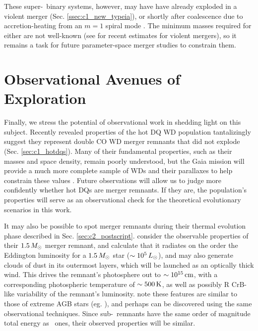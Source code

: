 These super-\Mch\ binary systems, however, may have have already exploded in a violent merger (Sec. \ref{ssec:c1_new_typeia}), or shortly after coalescence due to accretion-heating from an $m = 1$ spiral mode \citep{kash+15}.  The minimum masses required for either are not well-known (see \citealt{dan+12, sato+16} for recent estimates for violent mergers), so it remains a task for future parameter-space merger studies to constrain them.
 
\section{Observational Avenues of Exploration}

Finally, we stress the potential of observational work in shedding light on this subject.  Recently revealed properties of the hot DQ WD population tantalizingly suggest they represent double CO WD merger remnants that did not explode (Sec. \ref{sec:c1_hotdqs}).  Many of their fundamental properties, such as their masses and space density, remain poorly understood, but the Gaia mission will provide a much more complete sample of WDs and their parallaxes to help constrain these values \citep{dunl15thesis}.  Future observations will allow us to judge more confidently whether hot DQs are merger remnants.  If they are, the population's properties will serve as an observational check for the theoretical evolutionary scenarios in this work.

It may also be possible to spot merger remnants during their thermal evolution phase described in Sec. \ref{sec:c2_postscript}.  \cite{schw+16} consider the observable properties of their $1.5\,\Msun$ merger remnant, and calculate that it radiates on the order the Eddington luminosity for a $1.5\,\Msun$ star ($\sim10^5\,\Lsun$), and may also generate clouds of dust in its outermost layers, which will be launched as an optically thick wind.  This drives the remnant's photosphere out to $\sim10^{15}\,\mathrm{cm}$, with a corresponding photospheric temperature of $\sim500\,\mathrm{K}$, as well as possibly R CrB-like variability of the remnant's luminosity.  \cite{schw+16} note these features are similar to those of extreme AGB stars (eg. \citealt{blum+06}), and perhaps can be discovered using the same observational techniques.  Since sub-\Mch\ remnants have the same order of magnitude total energy as \Mch\ ones, their observed properties will be similar.

